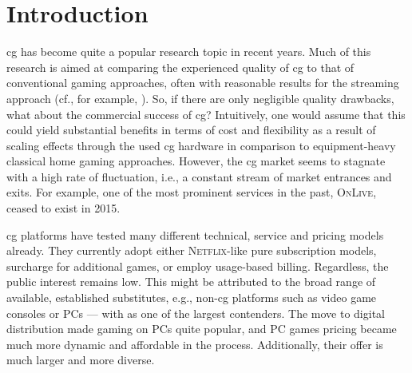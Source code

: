 
\section{Introduction}

\Gls{cg} has become quite a popular research topic in recent years.
Much of this research is aimed at comparing the experienced quality of
\gls{cg} to that of conventional gaming approaches, often with
reasonable results for the streaming approach (cf., for example,
\cite{5976180}). So, if there are only negligible quality drawbacks,
what about the commercial success of \gls{cg}? Intuitively, one
would assume that this could yield substantial benefits in terms of cost
and flexibility as a result of scaling effects through the used
\gls{cg} hardware in comparison to equipment-heavy classical home gaming
approaches. However, the \gls{cg} market seems to stagnate with a
high rate of fluctuation, i.e., a constant stream of
market entrances and exits. For example, one of the most prominent
services in the past, \textsc{OnLive}, ceased to exist in 2015.




\Gls{cg} platforms have tested many different technical, service
and pricing models already. They currently adopt either
\textsc{Netflix}-like pure subscription models, surcharge for
additional games, or employ usage-based billing. Regardless, the public
interest remains low. This might be attributed to the broad range of
available, established substitutes, e.g., non-\gls{cg} platforms
such as video game consoles or PCs ---
with \steam{} as one of the
largest contenders. The move to digital distribution made gaming on PCs
quite popular, and PC games pricing became much more dynamic and
affordable in the process. Additionally, their offer is much larger
and more diverse.



